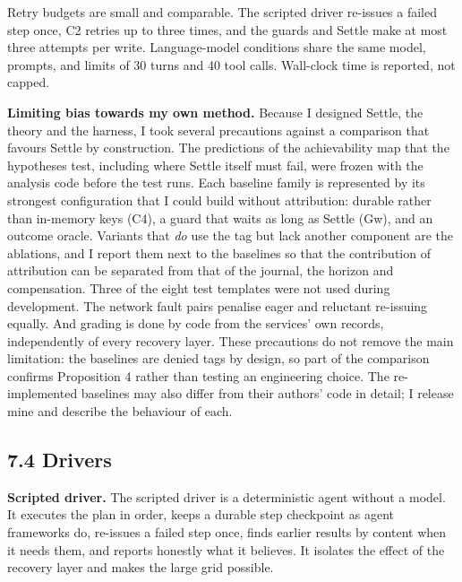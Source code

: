 \documentclass[
  10pt,
]{article}
\begin{document}
Retry budgets are small and comparable. The scripted driver re-issues a
failed step once, C2 retries up to three times, and the guards and
Settle make at most three attempts per write. Language-model conditions
share the same model, prompts, and limits of 30 turns and 40 tool calls.
Wall-clock time is reported, not capped.

\textbf{Limiting bias towards my own method.} Because I designed Settle,
the theory and the harness, I took several precautions against a
comparison that favours Settle by construction. The predictions of the
achievability map that the hypotheses test, including where Settle
itself must fail, were frozen with the analysis code before the test
runs. Each baseline family is represented by its strongest configuration
that I could build without attribution: durable rather than in-memory
keys (C4), a guard that waits as long as Settle (Gw), and an outcome
oracle. Variants that \emph{do} use the tag but lack another component
are the ablations, and I report them next to the baselines so that the
contribution of attribution can be separated from that of the journal,
the horizon and compensation. Three of the eight test templates were not
used during development. The network fault pairs penalise eager and
reluctant re-issuing equally. And grading is done by code from the
services' own records, independently of every recovery layer. These
precautions do not remove the main limitation: the baselines are denied
tags by design, so part of the comparison confirms Proposition 4 rather
than testing an engineering choice. The re-implemented baselines may
also differ from their authors' code in detail; I release mine and
describe the behaviour of each.

\hypertarget{drivers}{%
\subsection*{7.4 Drivers}\label{drivers}}

\textbf{Scripted driver.} The scripted driver is a deterministic agent
without a model. It executes the plan in order, keeps a durable step
checkpoint as agent frameworks do, re-issues a failed step once, finds
earlier results by content when it needs them, and reports honestly what
it believes. It isolates the effect of the recovery layer and makes the
large grid possible.
\end{document}
